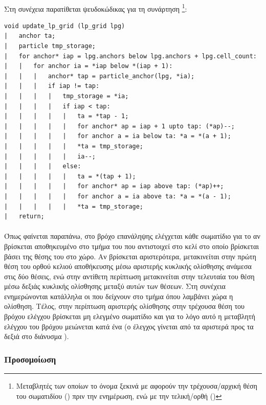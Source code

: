 \paragraph{} Στη συνέχεια παρατίθεται ψευδοκώδικας για τη συνάρτηση
\footnote{Μεταβλητές των οποίων το όνομα ξεκινά με  αφορούν
  την τρέχουσα/αρχική θέση του σωματιδίου () πριν την ενημέρωση, ενώ με
   την τελική/ορθή ()}: 
\begin{verbatim}
void update_lp_grid (lp_grid lpg)
|   anchor ta;
|   particle tmp_storage;
|   for anchor* iap = lpg.anchors below lpg.anchors + lpg.cell_count:
|   |   for anchor ia = *iap below *(iap + 1):
|   |   |   anchor* tap = particle_anchor(lpg, *ia);
|   |   |   if iap != tap:
|   |   |   |   tmp_storage = *ia;
|   |   |   |   if iap < tap:
|   |   |   |   |   ta = *tap - 1;
|   |   |   |   |   for anchor* ap = iap + 1 upto tap: (*ap)--;
|   |   |   |   |   for anchor a = ia below ta: *a = *(a + 1);
|   |   |   |   |   *ta = tmp_storage;
|   |   |   |   |   ia--;
|   |   |   |   else:
|   |   |   |   |   ta = *(tap + 1);
|   |   |   |   |   for anchor* ap = iap above tap: (*ap)++;
|   |   |   |   |   for anchor a = ia above ta: *a = *(a - 1);
|   |   |   |   |   *ta = tmp_storage;
|   return;
\end{verbatim}

\paragraph{} Όπως φαίνεται παραπάνω, στο βρόχο επανάληψης ελέγχεται κάθε σωματίδιο για το
αν βρίσκεται αποθηκευμένο στο τμήμα του  που αντιστοιχεί στο κελί στο οποίο
βρίσκεται βάσει της θέσης του στο χώρο. Αν βρίσκεται αριστερότερα, μετακινείται στην πρώτη
θέση του ορθού κελιού αποθήκευσης μέσω αριστερής κυκλικής ολίσθησης ανάμεσα στις δύο
θέσεις, ενώ στην αντίθετη περίπτωση μετακινείται στην τελευταία του θέση μέσω δεξιάς
κυκλικής ολίσθησης μεταξύ αυτών των θέσεων. Στη συνέχεια ενημερώνονται κατάλληλα οι
 που δείχνουν στο τμήμα όπου λαμβάνει χώρα η ολίσθηση. Τέλος, στην περίπτωση
αριστερής ολίσθησης στην τρέχουσα θέση του βρόχου ελέγχου βρίσκεται μη ελεγμένο σωματίδιο
και για το λόγο αυτό η μεταβλητή ελέγχου του βρόχου  μειώνεται κατά ένα (ο έλεγχος
γίνεται από τα αριστερά προς τα δεξιά στο διάνυσμα ).

\subsubsection{Προσομοίωση}
\label{sssec:simulation}
